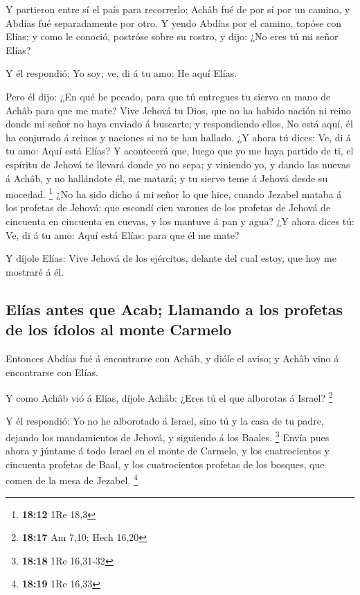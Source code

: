  Y partieron entre sí el país para recorrerlo: Achâb fué
de por sí por un camino, y Abdías fué separadamente por otro.
 Y yendo Abdías por el camino, topóse con Elías; y como le
conoció, postróse sobre su rostro, y dijo: ¿No eres tú mi señor Elías?

 Y él respondió: Yo soy; ve, di á tu amo: He aquí Elías.

 Pero él dijo: ¿En qué he pecado, para que tú entregues tu
siervo en mano de Achâb para que me mate?  Vive Jehová tu
Dios, que no ha habido nación ni reino donde mi señor no haya enviado á
buscarte; y respondiendo ellos, No está aquí, él ha conjurado á reinos y
naciones si no te han hallado.  ¿Y ahora tú dices: Ve, di
á tu amo: Aquí está Elías?  Y acontecerá que, luego que
yo me haya partido de ti, el espíritu de Jehová te llevará donde yo no
sepa; y viniendo yo, y dando las nuevas á Achâb, y no hallándote él, me
matará; y tu siervo teme á Jehová desde su mocedad. \footnote{\textbf{18:12}
  1Re 18,3}  ¿No ha sido dicho á mi señor lo que hice,
cuando Jezabel mataba á los profetas de Jehová: que escondí cien varones
de los profetas de Jehová de cincuenta en cincuenta en cuevas, y los
mantuve á pan y agua?  ¿Y ahora dices tú: Ve, di á tu
amo: Aquí está Elías: para que él me mate?

 Y díjole Elías: Vive Jehová de los ejércitos, delante
del cual estoy, que hoy me mostraré á él.

\hypertarget{eluxedas-antes-que-acab-llamando-a-los-profetas-de-los-uxeddolos-al-monte-carmelo}{%
\subsection{Elías antes que Acab; Llamando a los profetas de los ídolos
al monte
Carmelo}\label{eluxedas-antes-que-acab-llamando-a-los-profetas-de-los-uxeddolos-al-monte-carmelo}}

 Entonces Abdías fué á encontrarse con Achâb, y dióle el
aviso; y Achâb vino á encontrarse con Elías.

 Y como Achâb vió á Elías, díjole Achâb: ¿Eres tú el que
alborotas á Israel? \footnote{\textbf{18:17} Am 7,10; Hech 16,20}

 Y él respondió: Yo no he alborotado á Israel, sino tú y
la casa de tu padre, dejando los mandamientos de Jehová, y siguiendo á
los Baales. \footnote{\textbf{18:18} 1Re 16,31-32}  Envía
pues ahora y júntame á todo Israel en el monte de Carmelo, y los
cuatrocientos y cincuenta profetas de Baal, y los cuatrocientos profetas
de los bosques, que comen de la mesa de Jezabel. \footnote{\textbf{18:19}
  1Re 16,33}

